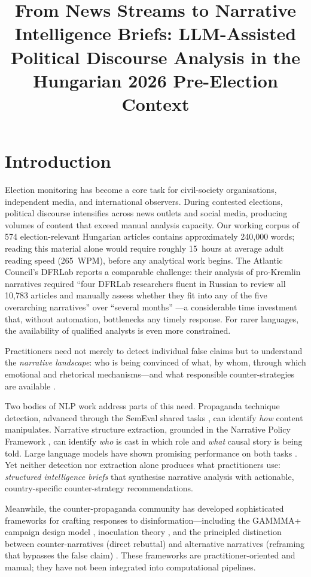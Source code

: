 \documentclass[10pt, a4paper]{article}
\title{From News Streams to Narrative Intelligence Briefs: LLM-Assisted Political Discourse Analysis in the Hungarian 2026 Pre-Election Context}
\begin{document}
\maketitleabstract

\section{Introduction}
\label{sec:intro}

Election monitoring has become a core task for civil-society organisations, independent media, and international observers. During contested elections, political discourse intensifies across news outlets and social media, producing volumes of content that exceed manual analysis capacity. Our working corpus of 574 election-relevant Hungarian articles contains approximately 240{,}000 words; reading this material alone would require roughly 15~hours at average adult reading speed (265~WPM), before any analytical work begins. The Atlantic Council's DFRLab reports a comparable challenge: their analysis of pro-Kremlin narratives required ``four DFRLab researchers fluent in Russian to review all 10{,}783 articles and manually assess whether they fit into any of the five overarching narratives'' over ``several months'' \citep{atlanticcouncil2024narrative}---a considerable time investment that, without automation, bottlenecks any timely response. For rarer languages, the availability of qualified analysts is even more constrained.

Practitioners need not merely to detect individual false claims but to understand the \emph{narrative landscape}: who is being convinced of what, by whom, through which emotional and rhetorical mechanisms---and what responsible counter-strategies are available \citep{resist2019}.

Two bodies of NLP work address parts of this need. Propaganda technique detection, advanced through the SemEval shared tasks \citep{dasamartino2019fine, piskorski2023semeval}, can identify \emph{how} content manipulates. Narrative structure extraction, grounded in the Narrative Policy Framework \citep[NPF;][]{jones2010narrative, shanahan2018narrative}, can identify \emph{who} is cast in which role and \emph{what} causal story is being told. Large language models have shown promising performance on both tasks \citep{ziems2024can, tornberg2023chatgpt}. Yet neither detection nor extraction alone produces what practitioners use: \emph{structured intelligence briefs} that synthesise narrative analysis with actionable, country-specific counter-strategy recommendations.

Meanwhile, the counter-propaganda community has developed sophisticated frameworks for crafting responses to disinformation---including the GAMMMA+ campaign design model \citep{ran2022alternative}, inoculation theory \citep{vanderlinden2017inoculating, roozenbeek2022psychological}, and the principled distinction between counter-narratives (direct rebuttal) and alternative narratives (reframing that bypasses the false claim) \citep{ran2022alternative, briggs2015western}. These frameworks are practitioner-oriented and manual; they have not been integrated into computational pipelines.
\end{document}
